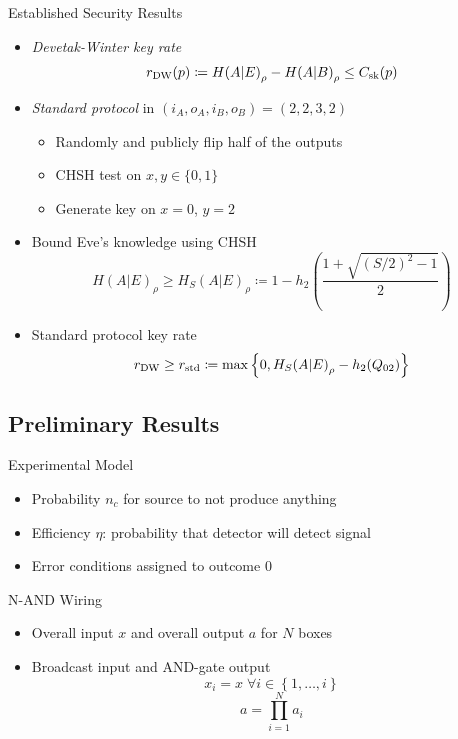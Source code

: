 \documentclass[xcolor=dvipsnames]{beamer}
\newcommand{\?}{\mathrel{?}} %
\newcommand{\dintv}[2]{\left\{#1,\ldots,#2\right\}}
\newcommand{\sk}{\rm sk}
\newcommand{\DW}{\rm DW}
\newcommand{\std}{\rm std}
\begin{document}
\begin{frame}{Established Security Results}
    \begin{itemize}[<+->]
    \item \emph{Devetak-Winter key rate}
      \[ r_{\DW}(p) \coloneqq {H(A|E)}_{\rho} - {H(A|B)}_{\rho} \leq C_{\sk}(p) \]
    \item \emph{Standard protocol} in \((i_A, o_A, i_B, o_B) = (2,2,3,2)\)
      \begin{itemize}
        \item Randomly and publicly flip half of the outputs
        \item CHSH test on \(x, y \in \{0,1\}\)
        \item Generate key on \(x=0\), \(y=2\)
      \end{itemize}
    \item Bound Eve's knowledge using CHSH
      \[ {H(A|E)}_{\rho} \geq {H_S(A|E)}_{\rho} \coloneqq 1 - h_2\left( \frac{1 + \sqrt{{(S/2)}^2-1}}{2} \right) \]
    \item Standard protocol key rate
      \[ r_{\DW} \geq r_{\std} \coloneqq \max \left\{ 0, {H_S(A|E)}_{\rho} - h_2(Q_{02}) \right\} \]
    \end{itemize}
\end{frame}

\subsection{Preliminary Results}

\begin{frame}{Experimental Model}
  \begin{itemize}[<+->]
    \item Probability \(n_c\) for source to not produce anything
    \item Efficiency \(\eta\): probability that detector will detect signal
    \item Error conditions assigned to outcome \(0\)
  \end{itemize}
\end{frame}

\begin{frame}{N-AND Wiring}
  \begin{itemize}[<+->]
    \item Overall input \(x\) and overall output \(a\) for \(N\) boxes
    \item Broadcast input and AND-gate output
      \[ x_i = x\;\forall i \in \dintv{1}{i} \]
      \[ a = \prod_{i=1}^N a_i \]
  \end{itemize}
\end{frame}
\end{document}
